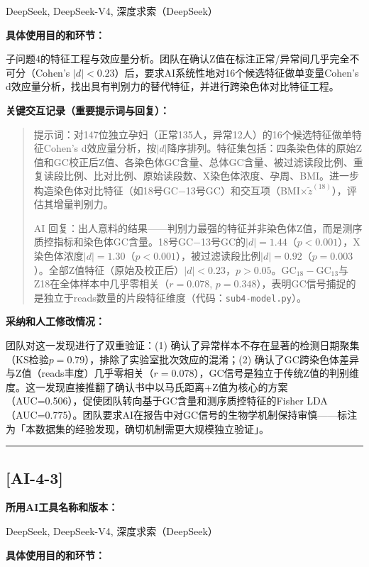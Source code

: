 \documentclass[12pt,a4paper]{ctexart}
\begin{document}
DeepSeek, DeepSeek-V4, 深度求索（DeepSeek）

\textbf{具体使用目的和环节：}

子问题4的特征工程与效应量分析。团队在确认Z值在标注正常/异常间几乎完全不可分（Cohen's $|d|<0.23$）后，要求AI系统性地对16个候选特征做单变量Cohen's d效应量分析，找出具有判别力的替代特征，并进行跨染色体对比特征工程。

\textbf{关键交互记录（重要提示词与回复）：}

\begin{quote}
提示词：对147位独立孕妇（正常135人，异常12人）的16个候选特征做单特征Cohen's d效应量分析，按$|d|$降序排列。特征集包括：四条染色体的原始Z值和GC校正后Z值、各染色体GC含量、总体GC含量、被过滤读段比例、重复读段比例、比对比例、原始读段数、X染色体浓度、孕周、BMI。进一步构造染色体对比特征（如18号GC$-$13号GC）和交互项（BMI$\times\tilde{z}^{(18)}$），评估其增量判别力。

AI 回复：出人意料的结果——判别力最强的特征并非染色体Z值，而是测序质控指标和染色体GC含量。18号GC$-$13号GC的$|d|=1.44$（$p<0.001$），X染色体浓度$|d|=1.30$（$p<0.001$），被过滤读段比例$|d|=0.92$（$p=0.003$）。全部Z值特征（原始及校正后）$|d|<0.23$，$p>0.05$。GC$_{18}-$GC$_{13}$与Z18在全体样本中几乎零相关（$r=0.078$, $p=0.348$），表明GC信号捕捉的是独立于reads数量的片段特征维度（代码：\texttt{sub4-model.py}）。
\end{quote}

\textbf{采纳和人工修改情况：}

团队对这一发现进行了双重验证：(1) 确认了异常样本不存在显著的检测日期聚集（KS检验$p=0.79$），排除了实验室批次效应的混淆；(2) 确认了GC跨染色体差异与Z值（reads丰度）几乎零相关（$r=0.078$），GC信号是独立于传统Z值的判别维度。这一发现直接推翻了确认书中以马氏距离+Z值为核心的方案（AUC=0.506），促使团队转向基于GC含量和测序质控特征的Fisher LDA（AUC=0.775）。团队要求AI在报告中对GC信号的生物学机制保持审慎——标注为「本数据集的经验发现，确切机制需更大规模独立验证」。

\vspace{1em}
\hrule
\vspace{1em}

\subsection*{[AI-4-3]}

\textbf{所用AI工具名称和版本：}

DeepSeek, DeepSeek-V4, 深度求索（DeepSeek）

\textbf{具体使用目的和环节：}
\end{document}
